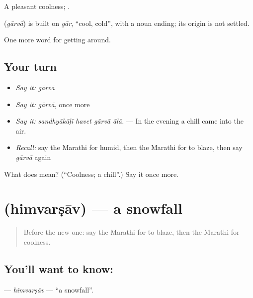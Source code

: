A pleasant coolness;  .

\begin{cousinweb}
\textbf{} (\emph{gārvā}) is built on \emph{gār}, \textquotedblleft{}cool, cold\textquotedblright{}, with a noun ending; its origin is not settled.
\end{cousinweb}

\begin{grammarlens}[title={What you've built}]
One more word for getting around.
\end{grammarlens}

\subsection*{Your turn}
\begin{itemize}
\raggedright
  \item \emph{Say it:} \emph{gārvā}
  \item \emph{Say it:} \emph{gārvā}, once more
  \item \emph{Say it:} \emph{sandhyākāḷī havet gārvā ālā.} — In the evening a chill came into the air.
  \item \emph{Recall:} say the Marathi for humid, then the Marathi for to blaze, then say \emph{gārvā} again
\end{itemize}

\begin{tcolorbox}[breakable,colback=teal!4,colframe=teal!35!black,title={Before you move on}]
What does  mean? (\textquotedblleft{}Coolness; a chill\textquotedblright{}.) Say it once more.
\end{tcolorbox}
\section[\texorpdfstring{\mr{हिमवर्षाव} (himvarṣāv)}{हिमवर्षाव (himvarṣāv)}]{ (himvarṣāv) — a snowfall}

\label{lesson:MR-C437-himvarsav}



\begin{quote}
Before the new one: say the Marathi for to blaze, then the Marathi for coolness.
\end{quote}

\subsection*{You'll want to know: }
\textbf{} — \emph{himvarṣāv} — \textquotedblleft{}a snowfall\textquotedblright{}.

